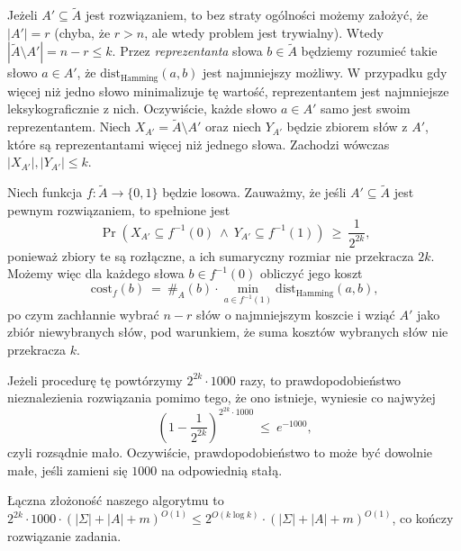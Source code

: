 \documentclass[12pt]{article}
\begin{document}
	\medskip
	
	Jeżeli \(A' \subseteq \tilde{A}\) jest rozwiązaniem, to bez straty ogólności
	możemy założyć, że \(|A'| = r\) (chyba, że \(r > n\), ale wtedy problem jest
	trywialny). Wtedy \(|\tilde{A} \setminus A'| = n - r \leqslant k\). Przez
	\textit{reprezentanta} słowa \(b \in \tilde{A}\) będziemy rozumieć takie
	słowo \(a \in A'\), że \(\text{dist}_{\text{Hamming}} (a, b)\) jest
	najmniejszy możliwy. W przypadku gdy więcej niż jedno słowo minimalizuje tę
	wartość, reprezentantem jest najmniejsze leksykograficznie z nich.
	Oczywiście, każde słowo \(a \in A'\) samo jest swoim reprezentantem. Niech
	\(X_{A'} = \tilde{A} \setminus A'\) oraz niech \(Y_{A'}\) będzie zbiorem
	słów z \(A'\), które są reprezentantami więcej niż jednego słowa. Zachodzi
	wówczas \(|X_{A'}|, |Y_{A'}| \leqslant k\).
	
	\medskip
	
	Niech funkcja \(f : \tilde{A} \to \{0, 1\}\) będzie losowa. Zauważmy, że
	jeśli \(A' \subseteq \tilde{A}\) jest pewnym rozwiązaniem, to spełnione jest
	\[ \Pr \left( X_{A'} \subseteq f^{-1}(0) \ \wedge \ Y_{A'} \subseteq
	f^{-1}(1) \right) \ \geqslant \ \frac{1}{2^{2k}} \text{,} \]
	ponieważ zbiory te są rozłączne, a ich sumaryczny rozmiar nie przekracza
	\(2k\). Możemy więc dla każdego słowa \(b \in f^{-1}(0)\) obliczyć jego
	koszt
	\[ \text{cost}_{f} (b) \ = \ \#_{A}(b) \cdot \min_{a \in f^{-1}(1)}
	\text{dist}_{\text{Hamming}} (a, b) \text{,} \]
	po czym zachłannie wybrać \(n - r\) słów o najmniejszym koszcie i wziąć
	\(A'\) jako zbiór niewybranych słów, pod warunkiem, że suma kosztów
	wybranych słów nie przekracza \(k\).
	
	\medskip
	
	Jeżeli procedurę tę powtórzymy \(2^{2k} \cdot 1000\) razy, to
	prawdopodobieństwo nieznalezienia rozwiązania pomimo tego, że ono istnieje,
	wyniesie co najwyżej
	\[ \left( 1 - \frac{1}{2^{2k}} \right) ^ {2^{2k} \cdot 1000} \ \leqslant \
	e^{-1000} \text{,} \]
	czyli rozsądnie mało. Oczywiście, prawdopodobieństwo to może być dowolnie
	małe, jeśli zamieni się \(1000\) na odpowiednią stałą.
	
	\medskip
	
	Łączna złożoność naszego algorytmu to \(2^{2k} \cdot 1000 \cdot (|\Sigma| +
	|A| + m) ^ {O(1)} \leqslant 2^{O(k \log k)} \cdot (|\Sigma| + |A| + m) ^
	{O(1)}\), co kończy rozwiązanie zadania.
\end{document}
